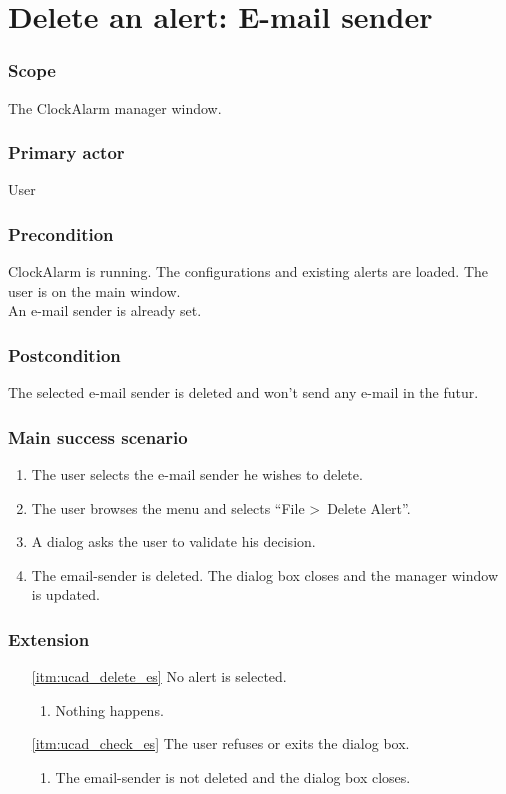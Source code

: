 \section{Delete an alert: E-mail sender}\label{subsec:usecase_delete_email_sender}

\subsubsection{Scope}
The ClockAlarm manager window.
\subsubsection{Primary actor}
User
\subsubsection{Precondition}
ClockAlarm is running. The configurations and existing alerts are loaded. The user is on the main window.
\\An e-mail sender is already set.
\subsubsection{Postcondition}
The selected e-mail sender is deleted and won't send any e-mail in the futur.
\subsubsection{Main success scenario}
\begin{enumerate}
	\item The user selects the e-mail sender he wishes to delete.
	\item \label{itm:ucad_delete_es} The user browses the menu and selects ``File \textgreater~Delete Alert''.
	\item \label{itm:ucad_check_es} A dialog asks the user to validate his decision.
	\item The email-sender is deleted. The dialog box closes and the manager window is updated.
\end{enumerate}
\subsubsection{Extension}
\begin{enumerate}
	\item[\ref{itm:ucad_delete_es}] No alert is selected.
	\begin{enumerate}[i]
		\item Nothing happens.
	\end{enumerate}
	
	\item[\ref{itm:ucad_check_es}] The user refuses or exits the dialog box.
	\begin{enumerate}[i]
		\item The email-sender is not deleted and the dialog box closes.
	\end{enumerate}
\end{enumerate}
